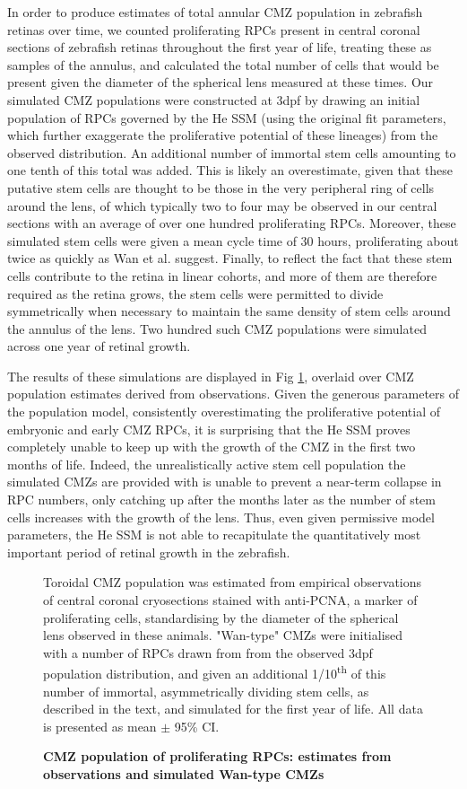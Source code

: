 \documentclass[10pt,letterpaper]{article}
\begin{document}
In order to produce estimates of total annular CMZ population in zebrafish retinas over time, we counted proliferating RPCs present in central coronal sections of zebrafish retinas throughout the first year of life, treating these as samples of the annulus, and calculated the total number of cells that would be present given the diameter of the spherical lens measured at these times. Our simulated CMZ populations were constructed at 3dpf by drawing an initial population of RPCs governed by the He SSM (using the original fit parameters, which further exaggerate the proliferative potential of these lineages) from the observed distribution. An additional number of immortal stem cells amounting to one tenth of this total was added. This is likely an overestimate, given that these putative stem cells are thought to be those in the very peripheral ring of cells around the lens, of which typically two to four may be observed in our central sections with an average of over one hundred proliferating RPCs. Moreover, these simulated stem cells were given a mean cycle time of 30 hours, proliferating about twice as quickly as Wan et al. suggest. Finally, to reflect the fact that these stem cells contribute to the retina in linear cohorts\cite{Centanin2014}, and more of them are therefore required as the retina grows, the stem cells were permitted to divide symmetrically when necessary to maintain the same density of stem cells around the annulus of the lens. Two hundred such CMZ populations were simulated across one year of retinal growth.

The results of these simulations are displayed in Fig \ref{WanSim}, overlaid over CMZ population estimates derived from observations. Given the generous parameters of the population model, consistently overestimating the proliferative potential of embryonic and early CMZ RPCs, it is surprising that the He SSM proves completely unable to keep up with the growth of the CMZ in the first two months of life. Indeed, the unrealistically active stem cell population the simulated CMZs are provided with is unable to prevent a near-term collapse in RPC numbers, only catching up after the months later as the number of stem cells increases with the growth of the lens. Thus, even given permissive model parameters, the He SSM is not able to recapitulate the quantitatively most important period of retinal growth in the zebrafish.

\begin{figure}[!h]
\caption{{\bf CMZ population of proliferating RPCs: estimates from observations and simulated Wan-type CMZs}}
Toroidal CMZ population was estimated from empirical observations of central coronal cryosections stained with anti-PCNA, a marker of proliferating cells, standardising by the diameter of the spherical lens observed in these animals. "Wan-type" CMZs were initialised with a number of RPCs drawn from from the observed 3dpf population distribution, and given an additional 1/10\textsuperscript{th} of this number of immortal, asymmetrically dividing stem cells, as described in the text, and simulated for the first year of life. All data is presented as mean $\pm$ 95\% CI.
\label{WanSim}
\end{figure}
\end{document}
